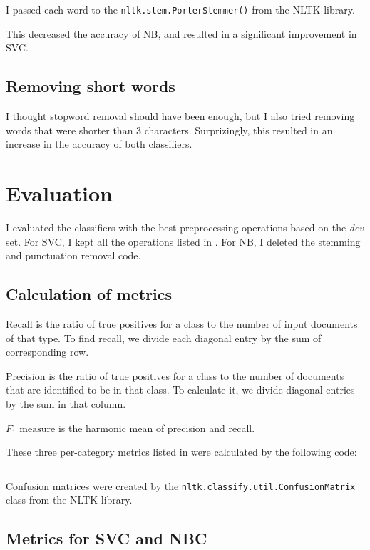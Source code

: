I passed each word to the \texttt{nltk.stem.PorterStemmer()} from the NLTK library.

This decreased the accuracy of NB, and resulted in a significant improvement in SVC.

\subsection{Removing short words}
\label{sec:shortwords}

I thought stopword removal should have been enough, but I also tried removing words that were shorter than 3 characters. Surprizingly, this resulted in an increase in the accuracy of both classifiers.

\section{Evaluation}
\label{sec:evaluation}

I evaluated the classifiers with the best preprocessing operations based on the \emph{dev} set. For SVC, I kept all the operations listed in . For NB, I deleted the stemming and punctuation removal code.

\subsection{Calculation of metrics}
\label{sec:calculation_metrics}

Recall is the ratio of true positives for a class to the number of input documents of that type. To find recall, we divide each diagonal entry by the sum of corresponding row.

Precision is the ratio of true positives for a class to the number of documents that are identified to be in that class. To calculate it, we divide diagonal entries by the sum in that column.

$F_1\text{ measure}$ is the harmonic mean of precision and recall.

These three per-category metrics listed in  were calculated by the following code:
\inputminted[]{python}{metrics.py}

Confusion matrices were created by the \texttt{nltk.classify.util.ConfusionMatrix} class from the NLTK library.

\subsection{Metrics for SVC and NBC}
\label{sec:metrics_svc_nbc}

